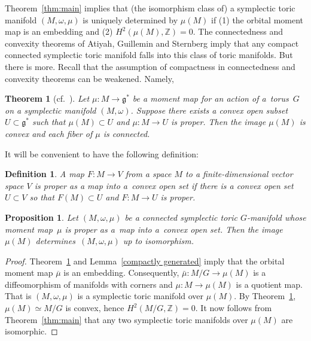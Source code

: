 \documentclass[pdftex]{sigma}
\numberwithin{equation}{section}
\newtheorem{Theorem}[Lemma]{Theorem}
\newtheorem{Proposition}[Lemma]{Proposition}
\newtheorem{Definition}[Lemma]{Definition}
\begin{document}
Theorem~\ref{thm:main} implies that (the isomorphism
class of) a symplectic toric manifold $(M,\omega, \mu)$ is uniquely
determined by $\mu(M)$ if (1) the orbital moment map is an
embedding and (2) $H^2(\mu(M),{\mathbb Z}) =0$.  The connectedness and
convexity theorems of Atiyah, Guillemin and Sternberg imply that any
compact connected symplectic toric manifold falls into this class of
toric manifolds. But there is more.  Recall that the assumption of
compactness in connectedness and convexity theorems can be weakened.
Namely,

\begin{Theorem}[cf.\ ]\label{thm:LMTW}
    Let $\mu\colon M\to {\mathfrak g}^*$ be a moment map for an action of a~torus~$G$
    on a symplectic manifold $(M,\omega)$.  Suppose there exists a
    convex open subset $U\subset {\mathfrak g}^*$ such that $\mu(M)\subset U$ and
    $\mu\colon M\to U$ is proper.  Then the image $\mu(M)$ is convex and
    each fiber of $\mu$ is connected.
\end{Theorem}

It will be convenient to have the following def\/inition:

\begin{Definition}
  A map $F\colon M\to V$ from a space $M$ to a f\/inite-dimensional vector
  space $V$ is {\em proper as a map into a~convex open set} if
  there is a convex open set $U\subset V$ so that $F(M)\subset U$ and
  $F\colon M\to U$ is proper.
\end{Definition}

\begin{Proposition} \label{Delzant over subset}
Let $(M,\omega,\mu)$ be a connected symplectic toric $G$-manifold
whose moment map~$\mu$ is proper as a~map into a~convex open set.
Then the image~$\mu(M)$ determines~$(M,\omega,\mu)$ up to isomorphism.
\end{Proposition}

\begin{proof}
  Theorem~\ref{thm:LMTW} and Lemma~\ref{compactly generated}
  imply that the orbital moment map $\overline{\mu}$ is an embedding.
  Consequently, $\bar{\mu}\colon M/G\to \mu(M)$ is a dif\/feomorphism
  of manifolds with corners and \mbox{$\mu\colon M\to \mu(M)$} is a quotient map.
  That is $(M,\omega, \mu)$ is a symplectic toric manifold over
  $\mu(M)$.  By Theorem~\ref{thm:LMTW}, $\mu(M) \simeq M/G$ is
  convex, hence $H^2(M/G,{\mathbb Z}) = 0$.  It now follows from
  Theorem~\ref{thm:main} that any two symplectic toric manifolds over
  $\mu(M)$ are isomorphic.
\end{proof}
\end{document}
